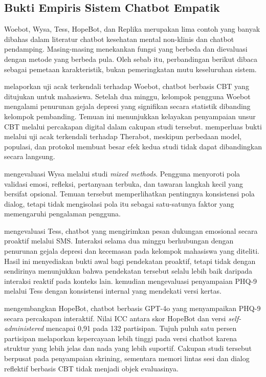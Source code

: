 \subsection{Bukti Empiris Sistem Chatbot Empatik}
\label{subsec:bukti-empiris}

Woebot, Wysa, Tess, HopeBot, dan Replika merupakan lima contoh yang banyak dibahas dalam literatur chatbot kesehatan mental non-klinis dan chatbot pendamping. Masing-masing menekankan fungsi yang berbeda dan dievaluasi dengan metode yang berbeda pula. Oleh sebab itu, perbandingan berikut dibaca sebagai pemetaan karakteristik, bukan pemeringkatan mutu keseluruhan sistem.

\textcite{fitzpatrick2017} melaporkan uji acak terkendali terhadap Woebot, chatbot berbasis CBT yang ditujukan untuk mahasiswa. Setelah dua minggu, kelompok pengguna Woebot mengalami penurunan gejala depresi yang signifikan secara statistik dibanding kelompok pembanding. Temuan ini menunjukkan kelayakan penyampaian unsur CBT melalui percakapan digital dalam cakupan studi tersebut. \textcite{heinz2025} memperluas bukti melalui uji acak terkendali terhadap Therabot, meskipun perbedaan model, populasi, dan protokol membuat besar efek kedua studi tidak dapat dibandingkan secara langsung.

\textcite{inkster2018} mengevaluasi Wysa melalui studi \textit{mixed methods}. Pengguna menyoroti pola validasi emosi, refleksi, pertanyaan terbuka, dan tawaran langkah kecil yang bersifat opsional. Temuan tersebut memperlihatkan pentingnya konsistensi pola dialog, tetapi tidak mengisolasi pola itu sebagai satu-satunya faktor yang memengaruhi pengalaman pengguna.

\textcite{fulmer2018} mengevaluasi Tess, chatbot yang mengirimkan pesan dukungan emosional secara proaktif melalui SMS. Interaksi selama dua minggu berhubungan dengan penurunan gejala depresi dan kecemasan pada kelompok mahasiswa yang diteliti. Hasil ini menyediakan bukti awal bagi pendekatan proaktif, tetapi tidak dengan sendirinya menunjukkan bahwa pendekatan tersebut selalu lebih baik daripada interaksi reaktif pada konteks lain. \textcite{dosovitsky2021} kemudian mengevaluasi penyampaian PHQ-9 melalui Tess dengan konsistensi internal yang mendekati versi kertas.

\textcite{guo2025} mengembangkan HopeBot, chatbot berbasis GPT-4o yang menyampaikan PHQ-9 secara percakapan interaktif. Nilai ICC antara skor HopeBot dan versi \textit{self-administered} mencapai 0,91 pada 132 partisipan. Tujuh puluh satu persen partisipan melaporkan kepercayaan lebih tinggi pada versi chatbot karena struktur yang lebih jelas dan nada yang lebih suportif. Cakupan studi tersebut berpusat pada penyampaian skrining, sementara memori lintas sesi dan dialog reflektif berbasis CBT tidak menjadi objek evaluasinya.


